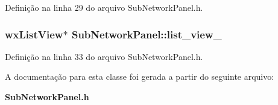 Definição na linha 29 do arquivo Sub\+Network\+Panel.\+h.

\subsubsection[{list\+\_\+view\+\_\+}]{\setlength{\rightskip}{0pt plus 5cm}wx\+List\+View$\ast$ Sub\+Network\+Panel\+::list\+\_\+view\+\_\+\hspace{0.3cm}{\ttfamily [protected]}}\label{class_sub_network_panel_a98c5cbd7cd1ebba46ac01e4a1cc1ee2e}


Definição na linha 33 do arquivo Sub\+Network\+Panel.\+h.



A documentação para esta classe foi gerada a partir do seguinte arquivo\+:\begin{DoxyCompactItemize}
\item 
{\bf Sub\+Network\+Panel.\+h}\end{DoxyCompactItemize}

